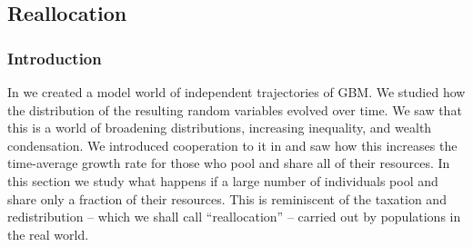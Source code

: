 %
%



\subsection{Reallocation}


\subsubsection{Introduction}

In  we created a model world of independent trajectories of GBM. We studied how the distribution of the resulting random variables evolved over time. We saw that this is a world of broadening distributions, increasing inequality, and wealth condensation. We introduced cooperation to it in  and saw how this increases the time-average growth rate for those who pool and share all of their resources. In this section we study what happens if a large number of individuals pool and share only a fraction of their resources. This is reminiscent of the taxation and redistribution -- which we shall call ``reallocation'' -- carried out by populations in the real world.

